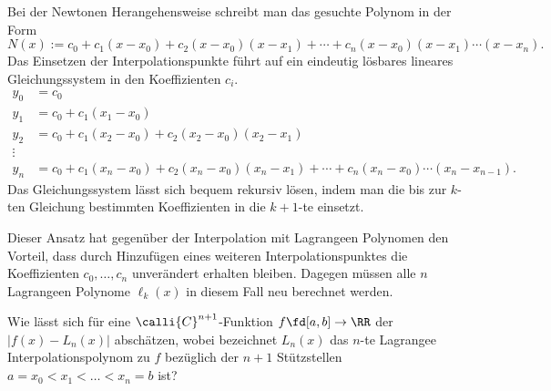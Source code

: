   \begin{antwort}
    Bei der Newton\sch en Herangehensweise 
    schreibt man das gesuchte Polynom in der Form 
    \[
    N(x) := c_0 + c_1( x-x_0 ) + c_2 (x-x_0) (x-x_1) + \cdots + 
    c_n( x-x_0)(x-x_1) \cdots (x-x_n).
    \]
    Das Einsetzen der Interpolationspunkte führt auf ein 
    eindeutig lösbares lineares Gleichungssystem in den Koeffizienten $c_i$. 
    \begin{align*}
      y_0 &= c_0 \\
      y_1 &= c_0 + c_1(x_1-x_0) \\
      y_2 &= c_0 + c_1(x_2-x_0) + c_2 (x_2-x_0)(x_2-x_1) \\
      \vdots & \\
      y_n &= c_0 + c_1(x_n-x_0) + c_2 (x_n-x_0)(x_n-x_1) + \cdots 
      + c_n (x_n-x_0)\cdots (x_n-x_{n-1}).
    \end{align*}
    Das Gleichungssystem lässt sich bequem 
    rekursiv lösen, indem man die bis zur $k$-ten Gleichung 
    bestimmten Koeffizienten in die $k+1$-te einsetzt. 

    Dieser Ansatz hat gegenüber der Interpolation mit Lagrange\sch en Polynomen 
    den Vorteil, dass durch Hinzufügen eines weiteren Interpolationspunktes 
    die Koeffizienten $c_0,\ldots, c_n$ unverändert erhalten bleiben. 
    Dagegen müssen alle $n$ Lagrange\sch en Polynome 
    $\ell_k (x)$ in diesem Fall neu berechnet werden.  
    \AntEnd
  \end{antwort}

  \begin{frage}\label{06_interpolationsfehler}
    Wie lässt sich für eine $\calli{C}^{n+1}$-Funktion 
    $f\fd [a,b] \to\RR$ der  
    $| f(x)-L_n(x) |$ abschätzen,  
    wobei bezeichnet $L_n(x)$ das $n$-te Lagrange\sch e 
    Interpolationspolynom zu $f$  bezüglich der 
    $n+1$ Stützstellen $a=x_0 <x_1< \ldots< x_n =b$ ist? 
  \end{frage}

